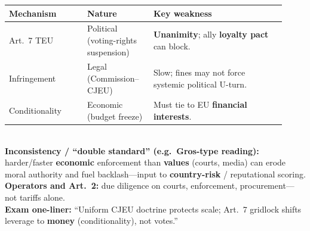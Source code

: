 \documentclass[10pt,a4paper]{article}
\begin{document}
{{\begin{tabular}{@{}p{0.26\linewidth}p{0.22\linewidth}p{0.44\linewidth}@{}}
\textbf{Mechanism} & \textbf{Nature} & \textbf{Key weakness} \\
\hline
Art.\ 7 TEU & Political (voting-rights suspension) & \textbf{Unanimity}; ally \textbf{loyalty pact} can block. \\
\hline
Infringement & Legal (Commission--CJEU) & Slow; fines may not force systemic political U-turn. \\
\hline
Conditionality & Economic (budget freeze) & Must tie to EU \textbf{financial interests}. \\
\hline
\end{tabular}}\\
\normalsize
\textbf{Inconsistency / ``double standard'' (e.g.\ Gros-type reading):} harder/faster \textbf{economic} enforcement than \textbf{values} (courts, media) can erode moral authority and fuel backlash---input to \textbf{country-risk} / reputational scoring.\\
\textbf{Operators and Art.\ 2:} due diligence on courts, enforcement, procurement---not tariffs alone.\\
\textbf{Exam one-liner:} ``Uniform CJEU doctrine protects scale; Art.\ 7 gridlock shifts leverage to \textbf{money} (conditionality), not votes.''
}
\end{document}
